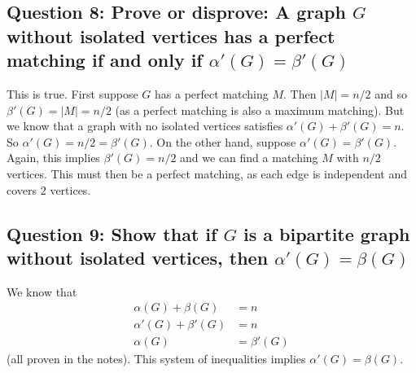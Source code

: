 \documentclass[letterpaper, 11pt]{article}
\newcommand{\1}{\mathds{1}}	%
\theoremstyle{definition}
\begin{document}
\subsection*{Question 8: Prove or disprove: A graph $G$ without isolated vertices has a perfect matching if and only if $\alpha ' (G) = \beta ' (G)$}
This is true. First suppose $G$ has a perfect matching $M$. Then $|M| = n/2$ and so $\beta ' (G) = |M| = n/2$ (as a perfect matching is also a maximum matching). But we know that a graph with no isolated vertices satisfies $\alpha ' (G) + \beta ' (G) = n$. So $\alpha ' (G) = n/2 = \beta ' (G)$. On the other hand, suppose $\alpha ' (G) = \beta '(G)$. Again, this implies $\beta ' (G) = n/2$ and we can find a matching $M$ with $n/2$ vertices. This must then be a perfect matching, as each edge is independent and covers $2$ vertices.

\subsection*{Question 9: Show that if $G$ is a bipartite graph without isolated vertices, then $\alpha ' (G) = \beta (G)$}
We know that \begin{align*}
\alpha (G) + \beta (G) & = n \\ 
\alpha ' (G) + \beta ' (G) & = n \\
\alpha (G) & = \beta ' (G)
\end{align*}
(all proven in the notes). This system of inequalities implies $\alpha ' (G) = \beta (G)$.
\end{document}
